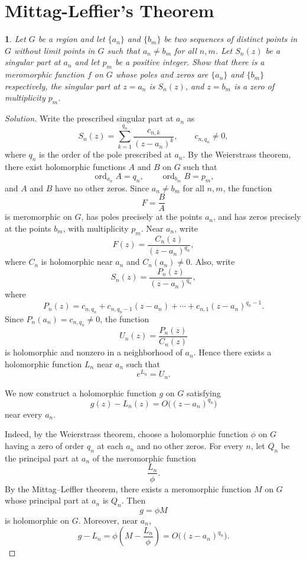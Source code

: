 \documentclass[12pt, a4paper]{report}
\theoremstyle{spaced}
\newtheorem{exercise}{}
\newcommand{\setexercise}[1]{\setcounter{exercise}{#1-1}}
\begin{document}
\section{Mittag-Leffier's Theorem}
\setexercise{1}
\begin{exercise}
	Let $G$ be a region and let $\{a_n\}$ and $\{b_m\}$ be two sequences of distinct points in $G$ without limit points in $G$ such that $a_n \neq b_m$ for all $n,m$. Let $S_n(z)$ be a singular part at $a_n$ and let $p_m$ be a positive integer. Show that there is a meromorphic function $f$ on $G$ whose poles and zeros are $\{a_n\}$ and $\{b_m\}$ respectively, the singular part at $z = a_n$ is $S_n(z)$, and $z = b_m$ is a zero of multiplicity $p_m$.
\end{exercise}

\begin{proof}[Solution]
	Write the prescribed singular part at \(a_n\) as
	\[
		S_n(z)=\sum_{k=1}^{q_n}\frac{c_{n,k}}{(z-a_n)^k},
		\qquad c_{n,q_n}\neq 0,
	\]
	where \(q_n\) is the order of the pole prescribed at \(a_n\).
	By the Weierstrass theorem, there exist holomorphic functions \(A\) and
	\(B\) on \(G\) such that
	\[
		\operatorname{ord}_{a_n}A=q_n,
		\qquad
		\operatorname{ord}_{b_m}B=p_m,
	\]
	and \(A\) and \(B\) have no other zeros. Since \(a_n\neq b_m\) for all
	\(n,m\), the function
	\[
		F=\frac{B}{A}
	\]
	is meromorphic on \(G\), has poles precisely at the points \(a_n\), and
	has zeros precisely at the points \(b_m\), with multiplicity \(p_m\).
	Near \(a_n\), write
	\[
		F(z)=\frac{C_n(z)}{(z-a_n)^{q_n}},
	\]
	where \(C_n\) is holomorphic near \(a_n\) and \(C_n(a_n)\neq 0\). Also,
	write
	\[
		S_n(z)=\frac{P_n(z)}{(z-a_n)^{q_n}},
	\]
	where
	\[
		P_n(z)
		=
		c_{n,q_n}
		+c_{n,q_n-1}(z-a_n)
		+\cdots
		+c_{n,1}(z-a_n)^{q_n-1}.
	\]
	Since \(P_n(a_n)=c_{n,q_n}\neq 0\), the function
	\[
		U_n(z)=\frac{P_n(z)}{C_n(z)}
	\]
	is holomorphic and nonzero in a neighborhood of \(a_n\). Hence there
	exists a holomorphic function \(L_n\) near \(a_n\) such that
	\[
		e^{L_n}=U_n.
	\]

	We now construct a holomorphic function \(g\) on \(G\) satisfying
	\[
		g(z)-L_n(z)=O\bigl((z-a_n)^{q_n}\bigr)
	\]
	near every \(a_n\).

	Indeed, by the Weierstrass theorem, choose a holomorphic function
	\(\phi\) on \(G\) having a zero of order \(q_n\) at each \(a_n\) and no
	other zeros. For every \(n\), let \(Q_n\) be the principal part at
	\(a_n\) of the meromorphic function
	\[
		\frac{L_n}{\phi}.
	\]
	By the Mittag--Leffler theorem, there exists a meromorphic function
	\(M\) on \(G\) whose principal part at \(a_n\) is \(Q_n\). Then
	\[
		g=\phi M
	\]
	is holomorphic on \(G\). Moreover, near \(a_n\),
	\[
		g-L_n
		=
		\phi\left(M-\frac{L_n}{\phi}\right)
		=
		O\bigl((z-a_n)^{q_n}\bigr).
	\]


\end{proof}
\end{document}
